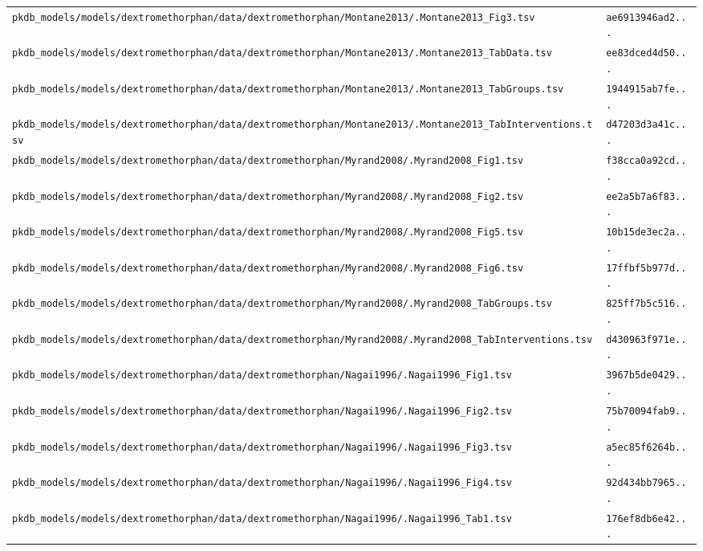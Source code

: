 \documentclass{article}
\begin{document}
\begin{longtable}{ll}
\texttt{pkdb\_models/models/dextromethorphan/data/dextromethorphan/Montane2013/.Montane2013\_Fig3.tsv} & \texttt{ae6913946ad2...} \\
\texttt{pkdb\_models/models/dextromethorphan/data/dextromethorphan/Montane2013/.Montane2013\_TabData.tsv} & \texttt{ee83dced4d50...} \\
\texttt{pkdb\_models/models/dextromethorphan/data/dextromethorphan/Montane2013/.Montane2013\_TabGroups.tsv} & \texttt{1944915ab7fe...} \\
\texttt{pkdb\_models/models/dextromethorphan/data/dextromethorphan/Montane2013/.Montane2013\_TabInterventions.tsv} & \texttt{d47203d3a41c...} \\
\texttt{pkdb\_models/models/dextromethorphan/data/dextromethorphan/Myrand2008/.Myrand2008\_Fig1.tsv} & \texttt{f38cca0a92cd...} \\
\texttt{pkdb\_models/models/dextromethorphan/data/dextromethorphan/Myrand2008/.Myrand2008\_Fig2.tsv} & \texttt{ee2a5b7a6f83...} \\
\texttt{pkdb\_models/models/dextromethorphan/data/dextromethorphan/Myrand2008/.Myrand2008\_Fig5.tsv} & \texttt{10b15de3ec2a...} \\
\texttt{pkdb\_models/models/dextromethorphan/data/dextromethorphan/Myrand2008/.Myrand2008\_Fig6.tsv} & \texttt{17ffbf5b977d...} \\
\texttt{pkdb\_models/models/dextromethorphan/data/dextromethorphan/Myrand2008/.Myrand2008\_TabGroups.tsv} & \texttt{825ff7b5c516...} \\
\texttt{pkdb\_models/models/dextromethorphan/data/dextromethorphan/Myrand2008/.Myrand2008\_TabInterventions.tsv} & \texttt{d430963f971e...} \\
\texttt{pkdb\_models/models/dextromethorphan/data/dextromethorphan/Nagai1996/.Nagai1996\_Fig1.tsv} & \texttt{3967b5de0429...} \\
\texttt{pkdb\_models/models/dextromethorphan/data/dextromethorphan/Nagai1996/.Nagai1996\_Fig2.tsv} & \texttt{75b70094fab9...} \\
\texttt{pkdb\_models/models/dextromethorphan/data/dextromethorphan/Nagai1996/.Nagai1996\_Fig3.tsv} & \texttt{a5ec85f6264b...} \\
\texttt{pkdb\_models/models/dextromethorphan/data/dextromethorphan/Nagai1996/.Nagai1996\_Fig4.tsv} & \texttt{92d434bb7965...} \\
\texttt{pkdb\_models/models/dextromethorphan/data/dextromethorphan/Nagai1996/.Nagai1996\_Tab1.tsv} & \texttt{176ef8db6e42...} \\

\end{longtable}
\end{document}
